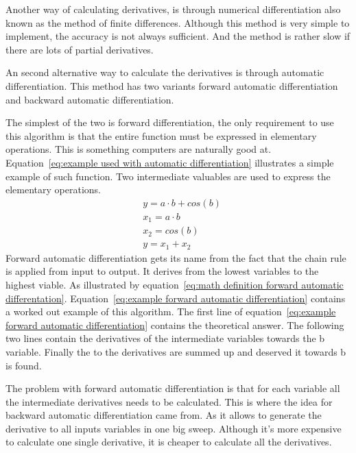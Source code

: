 Another way of calculating derivatives, is through numerical differentiation also known as the method of finite differences. Although this method is very simple to implement, the accuracy is not always sufficient. And the method is rather slow if there are lots of partial derivatives.

An second alternative way to calculate the derivatives is through automatic differentiation. This method has two variants forward automatic differentiation and backward automatic differentiation.

The simplest of the two is forward differentiation, the only requirement to use this algorithm is that the entire function must be expressed in elementary operations. This is something computers are naturally good at. Equation~\ref{eq:example used with automatic differentiation} illustrates a simple example of such function. Two intermediate valuables are used to express the elementary operations.
\begin{equation}
	\begin{aligned}
		& y = a \cdot b + cos(b) \\
		& x_1 = a \cdot b \\
		& x_2 = cos(b) \\
		& y = x_1 + x_2		
	\end{aligned}
	\label{eq:example used with automatic differentiation}
\end{equation}
Forward automatic differentiation gets its name from the fact that the chain rule is applied from input to output. It derives from the lowest variables to the highest viable. As illustrated by equation~\ref{eq:math definition forward automatic differentation}. Equation~\ref{eq:example forward automatic differentiation} contains a worked out example of this algorithm. The first line of equation~\ref{eq:example forward automatic differentiation} contains the theoretical answer. The  following two lines contain the derivatives of the intermediate variables towards the b variable. Finally the to the derivatives are summed up and deserved it towards b is found.

The problem with forward automatic differentiation is that for each variable all the intermediate derivatives needs to be calculated. This is where the idea for backward automatic differentiation came from. As it allows to generate the derivative to all inputs variables in one big sweep. Although it's more expensive to calculate one single derivative, it is cheaper to calculate all the derivatives.

